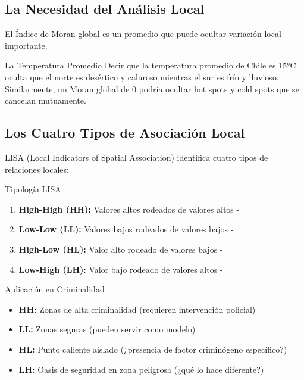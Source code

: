 \documentclass[12pt,a4paper]{article}
\begin{document}
\subsection{La Necesidad del Análisis Local}

El Índice de Moran global es un promedio que puede ocultar variación local importante.

\begin{analogia}{La Temperatura Promedio}
Decir que la temperatura promedio de Chile es 15°C oculta que el norte es desértico y caluroso mientras el sur es frío y lluvioso. Similarmente, un Moran global de 0 podría ocultar hot spots y cold spots que se cancelan mutuamente.
\end{analogia}

\subsection{Los Cuatro Tipos de Asociación Local}

LISA (Local Indicators of Spatial Association) identifica cuatro tipos de relaciones locales:

\begin{conceptbox}{Tipología LISA}
\begin{enumerate}
    \item \textbf{High-High (HH):} Valores altos rodeados de valores altos - 
    \item \textbf{Low-Low (LL):} Valores bajos rodeados de valores bajos - 
    \item \textbf{High-Low (HL):} Valor alto rodeado de valores bajos - 
    \item \textbf{Low-High (LH):} Valor bajo rodeado de valores altos - 
\end{enumerate}
\end{conceptbox}

\begin{ejemplo}{Aplicación en Criminalidad}
\begin{itemize}
    \item \textbf{HH:} Zonas de alta criminalidad (requieren intervención policial)
    \item \textbf{LL:} Zonas seguras (pueden servir como modelo)
    \item \textbf{HL:} Punto caliente aislado (¿presencia de factor criminógeno específico?)
    \item \textbf{LH:} Oasis de seguridad en zona peligrosa (¿qué lo hace diferente?)
\end{itemize}
\end{ejemplo}
\end{document}

